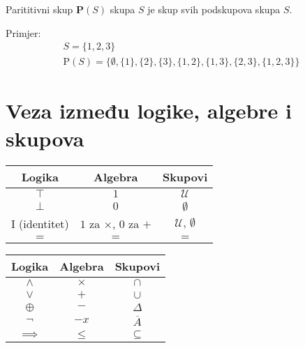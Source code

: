 Parititivni skup $\mathbf{P}(S)$ skupa $S$ je skup svih podskupova skupa $S$.

Primjer:
\begin{gather*}
    S = \{1,2,3\}\\
    \mathrm{P}(S) = \{\emptyset, \{1\}, \{2\}, \{3\}, \{1,2\}, \{1,3\}, \{2,3\}, \{1,2,3\}\}
\end{gather*}

\section{Veza između logike, algebre i skupova}

\begin{center}
    \begin{multicols}{2}
        \begin{tabular}{c|c|c}
            Logika & Algebra & Skupovi\\
            \hline
            $\top$ & $1$ & $\mathcal{U}$\\
            $\bot$ & $0$ & $\emptyset$\\
            $\mathrm{I}$ (identitet) & $1$ za $\times$, $0$ za $+$ & $\mathcal{U},\,\emptyset$\\
            $=$ & $=$ & $=$\\

        \end{tabular}

        \columnbreak

        \begin{tabular}{c|c|c}
            Logika & Algebra & Skupovi\\
            \hline
            $\wedge$ & $\times$ & $\cap$\\
            $\vee$ & $+$ & $\cup$\\
            $\oplus$ & $-$ & $\Delta$\\
            $\neg$ & $-x$ & $\overline{A}$\\
            $\implies$ & $\leq$ & $\subseteq$\\
        \end{tabular}
    \end{multicols}
\end{center}
